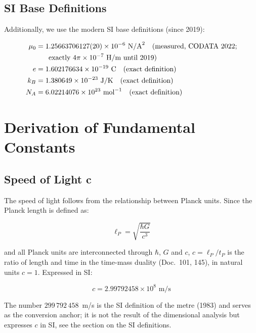 	\subsection{SI Base Definitions}
	
	Additionally, we use the modern SI base definitions (since 2019):
	
	\begin{align}
		\mu_0 &= 1.25663706127(20) \times 10^{-6} \text{ N/A}^2 \quad \text{(measured, CODATA 2022;}\\
		&\phantom{=}\quad \text{exactly } 4\pi \times 10^{-7} \text{ H/m until 2019)} \notag\\
		e &= 1.602176634 \times 10^{-19} \text{ C} \quad \text{(exact definition)}\\
		k_B &= 1.380649 \times 10^{-23} \text{ J/K} \quad \text{(exact definition)}\\
		N_A &= 6.02214076 \times 10^{23} \text{ mol}^{-1} \quad \text{(exact definition)}
	\end{align}
	
	\section{Derivation of Fundamental Constants}
	
	\subsection{Speed of Light c}
	
	The speed of light follows from the relationship between Planck units. Since the Planck length is defined as:
	
	\begin{equation}
		\ell_P = \sqrt{\frac{\hbar G}{c^3}}
	\end{equation}
	
	and all Planck units are interconnected through $\hbar$, $G$ and $c$, $c = \ell_P/t_P$ is the ratio of length and time in the time-mass duality (Doc.~101, 145), in natural units $c = 1$. Expressed in SI:
	
	\begin{tcolorbox}[colback=green!5!white,colframe=green!75!black,title=Speed of Light]
		\begin{equation}
			\boxed{c = 2.99792458 \times 10^8 \text{ m/s}}
		\end{equation}
	\end{tcolorbox}
	
	The number $299\,792\,458$~m/s is the SI definition of the metre (1983) and serves as the conversion anchor; it is not the result of the dimensional analysis but expresses $c$ in SI, see the section on the SI definitions.
	
